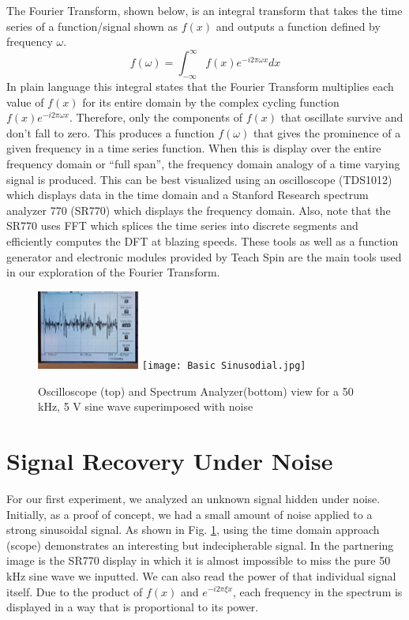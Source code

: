 \documentclass[prl,twocolumn,superscriptaddress,floatfix]{revtex4}
\begin{document}
The Fourier Transform, shown below, is an integral transform that takes the time series of a function/signal shown as $f(x)$ and outputs a function defined by frequency $\omega$. 
\begin{equation}
f(\omega) = \int_{-\infty}^{\infty} f(x)e^{-i2\pi \omega x}dx  \label{firstequation}
\end{equation}
In plain language this integral states that the Fourier Transform multiplies each value of $f(x)$ for its entire domain by the complex cycling function $f(x)e^{-i2\pi \omega x}$. Therefore, only the components of $f(x)$ that oscillate survive and don't fall to zero. This produces a function $f(\omega)$ that gives the prominence of a given frequency in a time series function. When this is display over the entire frequency domain or ``full span'', the frequency domain analogy of a time varying signal is produced.
This can be best visualized using an oscilloscope (TDS1012) which displays data in the time domain and a Stanford Research spectrum analyzer 770 (SR770) which displays the frequency domain.
Also, note that the SR770 uses FFT which splices the time series into discrete segments and efficiently computes the DFT at blazing speeds. These tools as well as a function generator and electronic modules provided
by Teach Spin are the main tools used in our exploration of the Fourier Transform.

\begin{figure}[H]
    \begin{center}
    \includegraphics[width = 0.3\textwidth]{Time Data.jpg}
    \texttt{[image: Basic Sinusodial.jpg]}
    \caption{\label{fig:1}Oscilloscope (top) and Spectrum Analyzer(bottom) view for a 50 kHz, 5 V sine wave superimposed with noise}
    \end{center}
\end{figure}

\section{Signal Recovery Under Noise} 
For our first experiment, we analyzed an unknown signal hidden under noise. Initially, as a proof of concept, we had a small amount of noise applied to a strong sinusoidal signal.
As shown in Fig. \ref{fig:1}, using the time domain approach (scope) demonstrates an interesting but indecipherable signal.
In the partnering image is the SR770 display in which it is almost impossible to miss the pure 50 kHz sine wave we inputted. 
We can also read the power of that individual signal itself. Due to the product of $f(x)$ and $e^{-i2 \pi \xi x}$, each frequency in the spectrum is displayed in a way that is proportional to its power.
\end{document}
